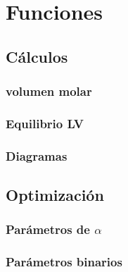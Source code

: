 \chapter{Funciones}
	\section{Cálculos}
		
		
		
		
		
		
		
		\subsection{volumen molar}
		\subsection{Equilibrio LV}
		
		
		
		
		
		
		

		
		\subsection{Diagramas}
	\section{Optimización}	
		\subsection{Parámetros de $\alpha$}
		\subsection{Parámetros binarios}
